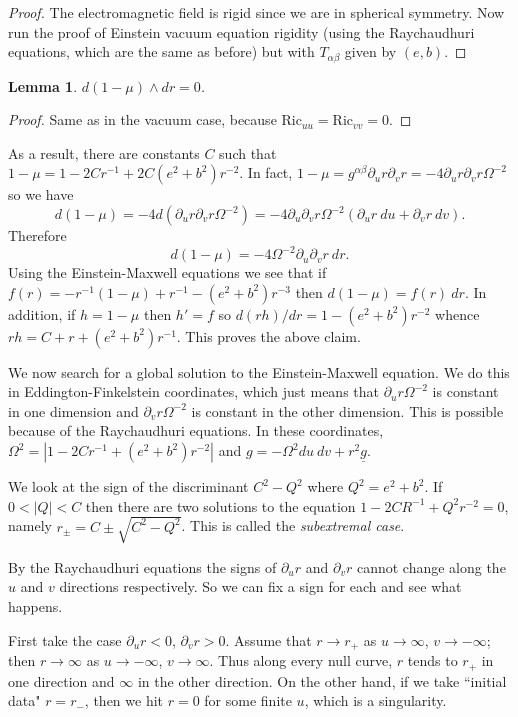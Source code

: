 \documentclass[12pt]{report}
\newcommand{\Ric}{\text{Ric}}
\newcommand{\dfn}[1]{\emph{#1}\index{#1}}
\newtheorem{lemma}[theorem]{Lemma}
\theoremstyle{definition}
\theoremstyle{remark}
\begin{document}
\begin{proof}
    The electromagnetic field is rigid since we are in spherical symmetry. Now run the proof of Einstein vacuum equation rigidity (using the Raychaudhuri equations, which are the same as before) but with $T_{\alpha\beta}$ given by $(e, b)$.
\end{proof}
\begin{lemma}
    $d(1 - \mu) \wedge dr = 0$.
\end{lemma}
\begin{proof}
    Same as in the vacuum case, because $\Ric_{uu} = \Ric_{vv} = 0$.
\end{proof}
As a result, there are constants $C$ such that $1 - \mu = 1 - 2Cr^{-1} + 2C(e^2 + b^2)r^{-2}$. In fact, $1 - \mu = g^{\alpha\beta} \partial_u r \partial_v r = -4\partial_u r \partial_vr \Omega^{-2}$ so we have
$$d(1 - \mu) = -4d(\partial_u r \partial_v r\Omega^{-2}) = -4 \partial_u\partial_vr \Omega^{-2} (\partial_ur ~du + \partial_vr ~dv).$$
Therefore
$$d(1 - \mu) = -4\Omega^{-2}\partial_u\partial_vr ~dr.$$
Using the Einstein-Maxwell equations we see that if $f(r) = -r^{-1}(1 - \mu) + r^{-1} - (e^2 + b^2)r^{-3}$ then $d(1 - \mu) = f(r) ~dr$. In addition, if $h = 1 - \mu$ then $h' = f$ so $d(rh)/dr = 1 - (e^2 + b^2)r^{-2}$ whence $rh = C + r + (e^2 + b^2)r^{-1}$. This proves the above claim.

We now search for a global solution to the Einstein-Maxwell equation. We do this in Eddington-Finkelstein coordinates, which just means that $\partial_ur \Omega^{-2}$ is constant in one dimension and $\partial_vr \Omega^{-2}$ is constant in the other dimension. This is possible because of the Raychaudhuri equations. In these coordinates, $\Omega^2 = |1 - 2Cr^{-1} + (e^2 + b^2)r^{-2}|$ and $g = -\Omega^2 du~dv + r^2 \underline g$.

We look at the sign of the discriminant $C^2 - Q^2$ where $Q^2 = e^2 + b^2$. If $0 < |Q| < C$ then there are two solutions to the equation $1 - 2CR^{-1} + Q^2r^{-2} = 0$, namely $r_\pm = C \pm \sqrt{C^2 - Q^2}$. This is called the \dfn{subextremal case}.

By the Raychaudhuri equations the signs of $\partial_ur$ and $\partial_vr$ cannot change along the $u$ and $v$ directions respectively. So we can fix a sign for each and see what happens.

First take the case $\partial_ur < 0$, $\partial_vr > 0$. Assume that $r \to r_+$ as $u \to \infty$, $v \to -\infty$; then $r \to \infty$ as $u \to -\infty$, $v \to \infty$. Thus along every null curve, $r$ tends to $r_+$ in one direction and $\infty$ in the other direction. On the other hand, if we take ``initial data" $r = r_-$, then we hit $r = 0$ for some finite $u$, which is a singularity.
\end{document}
